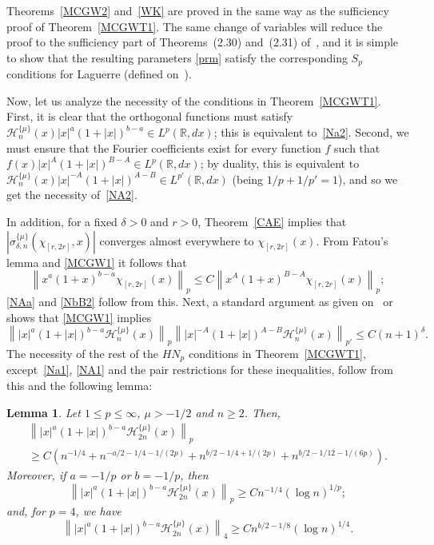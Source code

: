 \documentclass{amsart}
\theoremstyle{plain}
\newtheorem{Lem}{Lemma}
\theoremstyle{definition}
\theoremstyle{remark}
\newcommand{\chem}[3]{\sigma_{#1,#2}^{\{#3\}}} %
\newcommand{\herfun}[2]{\mathcal{H}_{#1}^{\{#2\}}}
\begin{document}
Theorems~\ref{MCGW2} and~\ref{WK} are proved in the same way as the sufficiency proof of
Theorem~\ref{MCGWT1}. The same change of variables will reduce the proof to the sufficiency part
of Theorems~(2.30) and~(2.31) of~\cite{MW}, and it is simple to show that the
resulting parameters \eqref{prm} satisfy the corresponding $S_p$ conditions for Laguerre (defined
on~\cite[p.~1126]{MW}).

Now, let us analyze the necessity of the conditions in Theorem~\ref{MCGWT1}.
First, it is clear that the orthogonal functions must satisfy
$\herfun{n}{\mu}(x)|x|^a(1+|x|)^{b-a} \in L^p(\mathbb{R},dx)$;
this is equivalent to~\eqref{Na2}.
Second, we must ensure that the Fourier coefficients exist for every
function $f$ such that $f(x)|x|^A(1+|x|)^{B-A} \in L^p(\mathbb{R},dx)$;
by duality, this is equivalent to
$\herfun{n}{\mu}(x)|x|^{-A}(1+|x|)^{A-B} \in L^{p'}(\mathbb{R},dx)$
(being $1/p+1/p'=1$), and so we get the necessity of~\eqref{NA2}.

In addition, for a fixed $\delta>0$ and $r>0$, Theorem~\ref{CAE} implies that
$|\chem{\delta}{n}{\mu}(\chi_{[r,2r]},x)|$ converges almost everywhere to
$\chi_{[r,2r]}(x)$.  From Fatou's lemma and \eqref{MCGW1} it follows
that
\[
  \left\| x^a(1+x)^{b-a}\chi_{[r,2r]}(x) \right\|_p
  \le C \left\| x^A(1+x)^{B-A}\chi_{[r,2r]}(x) \right\|_p;
\]
\eqref{NAa} and \eqref{NbB2} follow from this.  Next, a standard argument as
given on~\cite[p.~1141]{MW} or~\cite[p.~113]{Th} shows that \eqref{MCGW1}
implies
\[
  \left\| |x|^a(1+|x|)^{b-a}\herfun{n}{\mu}(x) \right\|_p
  \left\| |x|^{-A}(1+|x|)^{A-B}\herfun{n}{\mu}(x) \right\|_{p'}
  \le C(n+1)^{\delta}.
\]
The necessity of the rest of the $H\!N_p$ conditions in Theorem~\ref{MCGWT1}, except~\eqref{Na1},
\eqref{NA1} and the pair restrictions for these inequalities, follow from this and the following
lemma:

\begin{Lem}
\label{SL}
Let $1\le p\le\infty$, $\mu>-1/2$ and $n\ge2$. Then,
\begin{multline*}
  \left\||x|^a(1+|x|)^{b-a}\herfun{2n}{\mu}(x)\right\|_p \\
  \ge C \left(n^{-1/4} + n^{-a/2-1/4-1/(2p)}
    + n^{b/2-1/4+1/(2p)} + n^{b/2-1/12-1/(6p)}\right).
\end{multline*}
Moreover, if $a=-1/p$ or $b=-1/p$, then
\[
  \left\||x|^a(1+|x|)^{b-a}\herfun{2n}{\mu}(x)\right\|_p
  \ge C n^{-1/4}(\log n)^{1/p};
\]
and, for $p=4$, we have
\[
  \left\||x|^a(1+|x|)^{b-a}\herfun{2n}{\mu}(x)\right\|_4
  \ge C n^{b/2-1/8}(\log n)^{1/4}.
\]
\end{Lem}
\end{document}
